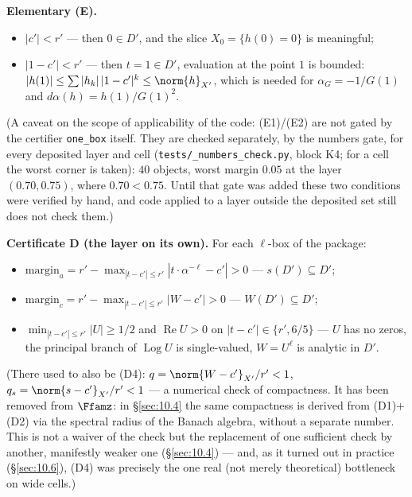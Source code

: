 \textbf{Elementary (E).}

\begin{itemize}
\item[(E1)] $|c'| < r'$ --- then $0 \in D'$, and the slice $X_0 = \{h(0) = 0\}$
  is meaningful;
\item[(E2)] $|1 - c'| < r'$ --- then $t = 1 \in D'$, evaluation at the point $1$
  is bounded: $|h(1)| \le \sum|h_k|\, |1-c'|^k \le \norm{h}_{X'}$,
  which is needed for $\alpha_G = -1/G(1)$ and
  $d\alpha(h) = h(1)/G(1)^2$.
\end{itemize}

(A caveat on the scope of applicability of the code: (E1)/(E2) are
not gated by the certifier \texttt{one\_box} itself. They are checked
separately, by the numbers gate, for every deposited layer and cell
(\texttt{tests/\allowbreak \_\allowbreak numbers\_\allowbreak check.py}, block
K4; for a cell the worst corner is taken): $40$ objects, worst margin $0.05$
at the layer $(0.70, 0.75)$, where $0.70 < 0.75$. Until that gate was added
these two conditions were verified by hand, and code applied to a layer
outside the deposited set still does not check them.)

\textbf{Certificate D (the layer on its own).} For each $\ell$-box of the
package:

\begin{itemize}
\item[(D1)] $\mathrm{margin}_a = r' - \max_{|t-c'|\le r'} |t\cdot\alpha^{-\ell} - c'| > 0$ --- $s(D')\subseteq D'$;
\item[(D2)] $\mathrm{margin}_c = r' - \max_{|t-c'|\le r'} |W - c'| > 0$ --- $W(D')\subseteq D'$;
\item[(D3)] $\min_{|t-c'|\le r'} |U| \ge 1/2$ and $\operatorname{Re} U > 0$ on $|t-c'| \in \{r', 6/5\}$ --- $U$ has no zeros, the principal branch of $\operatorname{Log} U$ is single-valued, $W = U^\ell$ is analytic in $D'$.
\end{itemize}

(There used to also be (D4): $q = \norm{W-c'}_{X'}/r' < 1$,
$q_s = \norm{s-c'}_{X'}/r' < 1$ --- a numerical check of compactness. It has
been removed from $\Ffamz$: in \S\ref{sec:10.4} the same compactness is derived from
(D1)+(D2) via the spectral radius of the Banach algebra, without a
separate number. This is not a waiver of the check but the
replacement of one sufficient check by another, manifestly weaker
one (\S\ref{sec:10.4}) --- and, as it turned out in practice (\S\ref{sec:10.6}), (D4) was
precisely the one real (not merely theoretical) bottleneck on wide
cells.)


